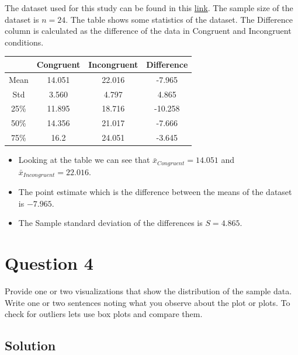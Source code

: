 \documentclass[12pt]{article}%
\begin{document}
The dataset used for this study can be found in this \href{https://drive.google.com/file/d/0B9Yf01UaIbUgQXpYb2NhZ29yX1U/view}{link}. The sample size of the dataset is $n=24$. The table shows some statistics of the dataset. The Difference column is calculated as the difference of the data in Congruent and Incongruent conditions.

\begin{center}
 \begin{tabular}{||c c c c||} 
 \hline
   & Congruent & Incongruent & Difference \\ [0.5ex] 
 \hline\hline
 Mean & 14.051 & 22.016 &  -7.965  \\ 
 \hline
 Std & 3.560  &   4.797 &  4.865 \\
 \hline
 25\% & 11.895  &  18.716 & -10.258 \\
 \hline
 50\% & 14.356  &  21.017 &  -7.666 \\
 \hline
 75\% & 16.2 &   24.051  & -3.645 \\ [1ex] 
 \hline
\end{tabular}
\end{center}

 \begin{itemize}
   \item Looking at the table we can see that $\bar{x}_{Congruent} = 14.051$ and $\bar{x}_{Incongruent} = 22.016$.
   \item The point estimate which is the difference between the means of the dataset is  $-7.965$. 
   \item The Sample standard deviation of the differences is $S = 4.865$.
 \end{itemize}

\newpage

\section*{Question 4}

 Provide one or two visualizations that show the distribution of the sample data. Write one or two sentences noting what you observe about the plot or plots. To check for outliers lets use box plots and compare them.

\subsection*{Solution}
\end{document}
